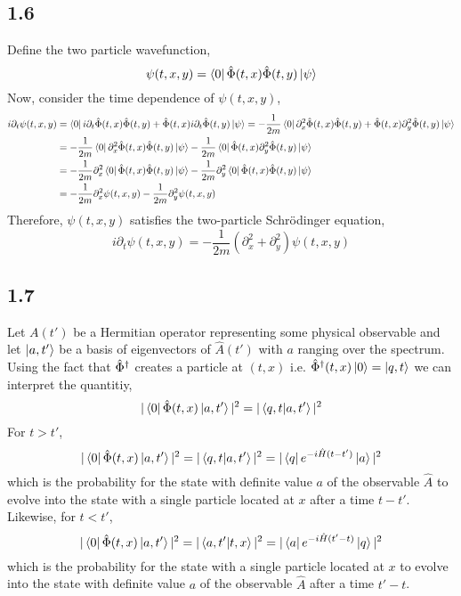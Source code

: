 \documentclass[12pt]{extarticle}
\begin{document}
\subsection*{1.6}
Define the two particle wavefunction,
\[ \psi(t, x, y) = \left< 0 \right| \hat{\Phi}(t, x) \hat{\Phi}(t, y) \left| \psi \right>\]
Now, consider the time dependence of $\psi(t, x, y)$,
\begin{align*}
i \partial_t \psi(t, x, y) & = \left< 0 \right| i \partial_t \hat{\Phi}(t, x) \hat{\Phi}(t, y) + \hat{\Phi}(t, x) i \partial_t \hat{\Phi}(t, y) \left| \psi \right> = - \frac{1}{2m} \left< 0 \right| \partial_x^2 \hat{\Phi}(t, x) \hat{\Phi}(t, y) + \hat{\Phi}(t, x) \partial_y^2 \hat{\Phi}(t, y) \left| \psi \right>
\\
& = - \frac{1}{2m} \left< 0 \right| \partial_x^2 \hat{\Phi}(t, x) \hat{\Phi}(t, y) \left| \psi \right> - \frac{1}{2m} \left< 0 \right| \hat{\Phi}(t, x) \partial_y^2 \hat{\Phi}(t, y) \left| \psi \right> 
\\
& = - \frac{1}{2m} \partial_x^2 \left< 0 \right| \hat{\Phi}(t, x) \hat{\Phi}(t, y) \left| \psi \right> - \frac{1}{2m} \partial_y^2 \left< 0 \right| \hat{\Phi}(t, x) \hat{\Phi}(t, y) \left| \psi \right>
\\
& = - \frac{1}{2m} \partial_x^2 \psi(t, x, y) - \frac{1}{2m} \partial_y^2 \psi(t, x, y)
\end{align*}
Therefore, $\psi(t, x, y)$ satisfies the two-particle Schrödinger equation,
\[ i \partial_t \psi(t, x, y) = - \frac{1}{2m} \left( \partial_x^2 + \partial_y^2 \right) \psi(t, x, y)\]
\subsection*{1.7}

Let $A(t')$ be a Hermitian operator representing some physical observable and let $\left| a, t' \right>$ be a basis of eigenvectors of $\hat{A}(t')$ with $a$ ranging over the spectrum. Using the fact that $\hat{\Phi}^\dagger$ creates a particle at $(t, x)$ i.e. $\hat{\Phi}^\dagger(t, x) \left| 0 \right> = \left| q, t \right>$ we can interpret the quantitiy, 
\[ |\left< 0 \right| \hat{\Phi}(t, x) \left| a, t' \right> |^2 = | \left< q, t | a, t' \right> |^2 \]
For $t > t'$,
\[ |\left< 0 \right| \hat{\Phi}(t, x) \left| a, t' \right> |^2 = | \left< q, t | a, t' \right> |^2 = | \left< q \right| e^{- i \hat{H} (t - t')} \left| a \right> |^2 \]
which is the probability for the state with definite value $a$ of the observable $\hat{A}$ to evolve into the state with a single particle located at $x$ after a time $t - t'$. \bigskip\\
Likewise, for $t < t'$,
\[ |\left< 0 \right| \hat{\Phi}(t, x) \left| a, t' \right> |^2 = | \left< a, t' | t, x \right> |^2 = | \left< a \right| e^{- i \hat{H} (t' - t)} \left| q \right> |^2 \]
which is the probability for the state with a single particle located at $x$ to evolve into the state with definite value $a$ of the observable $\hat{A}$ after a time $t' - t$. \bigskip\\
\end{document}
